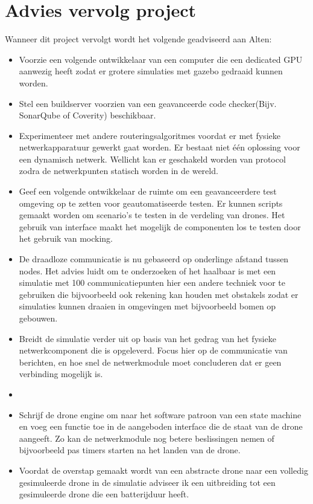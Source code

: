 \documentclass[a4paper, 11pt, oneside]{report}
\begin{document}
\section{Advies vervolg project}\label{sec:advies-vervolg-project}
Wanneer dit project vervolgt wordt het volgende geadviseerd aan Alten:
\begin{itemize}
	\item Voorzie een volgende ontwikkelaar van een computer die een dedicated GPU aanwezig heeft zodat er grotere simulaties met gazebo gedraaid kunnen worden.
	
	\item Stel een buildserver voorzien van een geavanceerde code checker(Bijv. SonarQube of Coverity) beschikbaar.
	 
	\item Experimenteer met andere routeringsalgoritmes voordat er met fysieke netwerkapparatuur gewerkt gaat worden. Er bestaat niet één oplossing voor een dynamisch netwerk. Wellicht kan er geschakeld worden van protocol zodra de netwerkpunten statisch worden in de wereld.  
	
	\item Geef een volgende ontwikkelaar de ruimte om een geavanceerdere test omgeving op te zetten voor geautomatiseerde testen.
	Er kunnen scripts gemaakt worden om scenario's te testen in de verdeling van drones. Het gebruik van interface maakt het mogelijk de componenten los te testen door het gebruik van mocking.
	
	\item De draadloze communicatie is nu gebaseerd op onderlinge afstand tussen nodes. Het advies luidt om te onderzoeken of het haalbaar is met een simulatie met 100 communicatiepunten hier een andere techniek voor te gebruiken die bijvoorbeeld ook rekening kan houden met obstakels zodat er simulaties kunnen draaien in omgevingen met bijvoorbeeld bomen op gebouwen.
	
	\item Breidt de simulatie verder uit op basis van het gedrag van het fysieke netwerkcomponent die is opgeleverd. Focus hier op de communicatie van berichten, en hoe snel de netwerkmodule moet concluderen dat er geen verbinding mogelijk is.
	
	\item 
	
	\item Schrijf de drone engine om naar het software patroon van een state machine en voeg een functie toe in de aangeboden interface die de staat van de drone aangeeft. Zo kan de netwerkmodule nog betere beslissingen nemen of bijvoorbeeld pas timers starten na het landen van de drone.
	\item Voordat de overstap gemaakt wordt van een abstracte drone naar een volledig gesimuleerde drone in de simulatie adviseer ik een uitbreiding tot een gesimuleerde drone die een batterijduur heeft.
\end{itemize}
\end{document}
